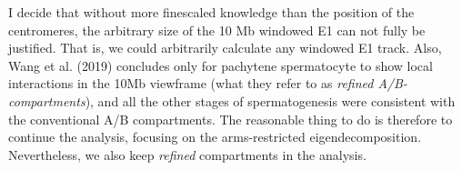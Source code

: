\documentclass[
  11pt,
  a4paper,
]{scrbook}
\let\origfigure\figure
\let\endorigfigure\endfigure
\renewenvironment{figure}[1][2] {
    \expandafter\origfigure\expandafter[htbp]
} {
    \endorigfigure
}
\begin{document}
I decide that without more finescaled knowledge than the position of the
centromeres, the arbitrary size of the 10 Mb windowed E1 can not fully
be justified. That is, we could arbitrarily calculate any windowed E1
track. Also, Wang et al. (2019) concludes only for pachytene
spermatocyte to show local interactions in the 10Mb viewframe (what they
refer to as \emph{refined A/B-compartments}), and all the other stages
of spermatogenesis were consistent with the conventional A/B
compartments. The reasonable thing to do is therefore to continue the
analysis, focusing on the arms-restricted eigendecomposition.
Nevertheless, we also keep \emph{refined} compartments in the analysis.

\begin{figure}

\begin{minipage}{0.05\linewidth}
~\end{minipage}%
%
\begin{minipage}{0.46\linewidth}



\end{minipage}%
%
\begin{minipage}{0.46\linewidth}

\end{minipage}
\end{figure}
\end{document}
